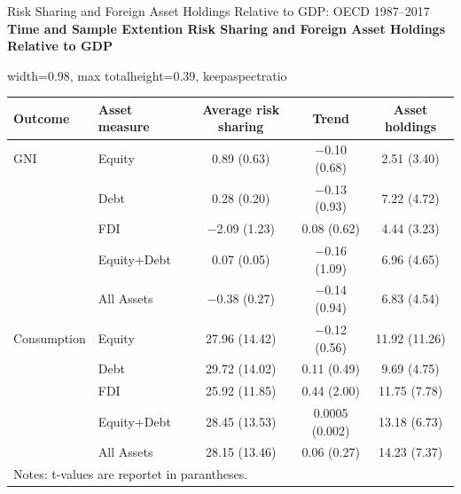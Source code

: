 \documentclass[aspectratio=169, 10pt]{beamer}
\begin{document}
\begin{frame}[t]{Risk Sharing and Foreign Asset Holdings Relative to GDP: OECD 1987--2017}
{\scriptsize \textbf{Time and Sample Extention Risk Sharing and Foreign Asset Holdings Relative to GDP}}

\vspace{0.04cm}

\begin{adjustbox}{
  width=0.98\textwidth,
  max totalheight=0.39\textheight,
  keepaspectratio
}
\begin{tabular}{llccc}
\hline\hline
Outcome & Asset measure & Average risk sharing & Trend & Asset holdings \\
\hline
GNI         & Equity       & 0.89 (0.63)    & $-$0.10 (0.68) & 2.51 (3.40)  \\
            & Debt         & 0.28 (0.20)    & $-$0.13 (0.93) & 7.22 (4.72)  \\
            & FDI          & $-$2.09 (1.23) & 0.08 (0.62)    & 4.44 (3.23)  \\
            & Equity+Debt  & 0.07 (0.05)    & $-$0.16 (1.09) & 6.96 (4.65)  \\
            & All Assets   & $-$0.38 (0.27) & $-$0.14 (0.94) & 6.83 (4.54)  \\
\hline
Consumption & Equity       & 27.96 (14.42)  & $-$0.12 (0.56) & 11.92 (11.26)\\
            & Debt         & 29.72 (14.02)  & 0.11 (0.49)    & 9.69 (4.75)  \\
            & FDI          & 25.92 (11.85)  & 0.44 (2.00)    & 11.75 (7.78) \\
            & Equity+Debt  & 28.45 (13.53)  & 0.0005 (0.002) & 13.18 (6.73) \\
            & All Assets   & 28.15 (13.46)  & 0.06 (0.27)    & 14.23 (7.37) \\
\hline\hline
  \multicolumn{5}{l}{\footnotesize Notes: t-values are reportet in parantheses.} \\
\end{tabular}
\end{adjustbox}

\endgroup

\end{frame}



\end{document}
